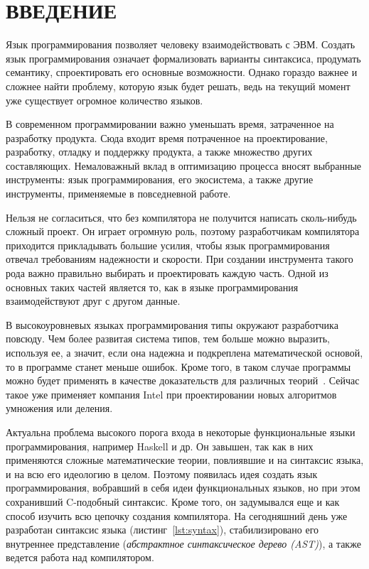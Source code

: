 \chapter*{ВВЕДЕНИЕ}\label{ch:introduction}


Язык программирования позволяет человеку взаимодействовать с ЭВМ.
Создать язык программирования означает формализовать варианты синтаксиса, продумать семантику, спроектировать его основные возможности.
Однако гораздо важнее и сложнее найти проблему, которую язык будет решать, ведь на текущий момент уже существует огромное количество языков.

В современном программировании важно уменьшать время, затраченное на разработку продукта.
Сюда входит время потраченное на проектирование, разработку, отладку и поддержку продукта, а также множество других составляющих.
Немаловажный вклад в оптимизацию процесса вносят выбранные инструменты: язык программирования, его экосистема, а также другие инструменты, применяемые в повседневной работе.

Нельзя не согласиться, что без компилятора не получится написать сколь-нибудь сложный проект.
Он играет огромную роль, поэтому разработчикам компилятора приходится прикладывать большие усилия, чтобы язык программирования отвечал требованиям надежности и скорости.
При создании инструмента такого рода важно правильно выбирать и проектировать каждую часть.
Одной из основных таких частей является то, как в языке программирования взаимодействуют друг с другом данные.


В высокоуровневых языках программирования типы окружают разработчика повсюду.
Чем более развитая система типов, тем больше можно выразить, используя ее, а значит, если она надежна и подкреплена математической основой, то в программе станет меньше ошибок.
Кроме того, в таком случае программы можно будет применять в качестве доказательств для различных теорий~\cite{AutoProvement}.
Сейчас такое уже применяет компания Intel при проектировании новых алгоритмов умножения или деления.

Актуальна проблема высокого порога входа в некоторые функциональные языки программирования, например Haskell и др.
Он завышен, так как в них применяются сложные математические теории, повлиявшие и на синтаксис языка, и на всю его идеологию в целом.
Поэтому появилась идея создать язык программирования, вобравший в себя идеи функциональных языков, но при этом сохранивший C-подобный синтаксис.
Кроме того, он задумывался еще и как способ изучить всю цепочку создания компилятора.
На сегодняшний день уже разработан синтаксис языка (листинг~\ref{lst:syntax}), стабилизировано его внутреннее представление (\textit{абстрактное синтаксическое дерево (AST)}), а также ведется работа над компилятором.

